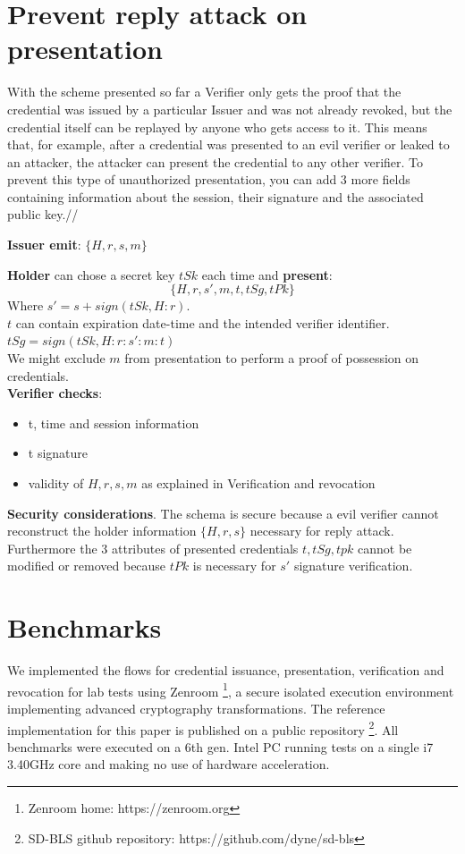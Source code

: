 \section{Prevent reply attack on presentation}
{\color{blue}
	With the scheme presented so far a Verifier only gets the proof that the
	credential was issued by a particular Issuer and was not already revoked, but the credential
	itself can be replayed by anyone who gets access to it.  This means
	that, for example, after a credential was presented to an evil verifier or leaked to an attacker, the attacker can present the credential to any other verifier.
	To prevent this type of unauthorized presentation, you can add 3 more fields containing information about the session, their signature and the associated public key.//

	\textbf{Issuer emit}: $\{H,r,s,m\}$

	\textbf{Holder} can chose a secret key $tSk$ each time and \textbf{present}:
	$$\{H,r,s',m,t,tSg,tPk\}$$
	Where $s'=s+sign(tSk,H:r)$.\\
	$t$ can contain expiration date-time and the intended verifier identifier.\\
	$tSg=sign(tSk,H:r:s':m:t)$\\
	We might exclude $m$ from presentation to perform a proof of possession on credentials.\\


	\textbf{Verifier checks}:
	\begin{itemize}
		\item t, time and session information
		\item t signature
		\item validity of $H,r,s,m$ as explained in Verification and revocation
	\end{itemize}

	\textbf{Security considerations}. The schema is secure because a
  evil verifier cannot reconstruct the holder information $\{H,r,s\}$
  necessary for reply attack. Furthermore the 3 attributes of
  presented credentials $t,tSg,tpk$ cannot be modified or removed
  because $tPk$ is necessary for $s'$ signature verification.  }


\section{Benchmarks}

We implemented the flows for credential issuance, presentation,
verification and revocation for lab tests using
Zenroom \footnote{Zenroom home: https://zenroom.org}, a secure
isolated execution environment implementing advanced cryptography
transformations. The reference implementation for this paper is
published on a public repository \footnote{SD-BLS github repository:
https://github.com/dyne/sd-bls}. All benchmarks were executed on a 6th
gen. Intel PC running tests on a single i7 3.40GHz core and making no
use of hardware acceleration.

